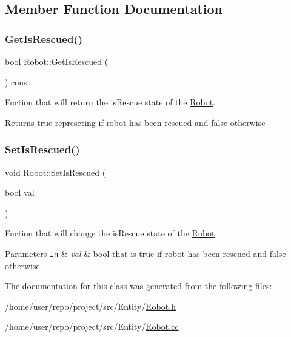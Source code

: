 \subsection{Member Function Documentation}
\mbox{\label{classRobot_a9c6db3ebb107d5e25fdb0c21b8cfa2e2}} 
\subsubsection{\texorpdfstring{Get\+Is\+Rescued()}{GetIsRescued()}}
{\footnotesize\ttfamily bool Robot\+::\+Get\+Is\+Rescued (\begin{DoxyParamCaption}{ }\end{DoxyParamCaption}) const}



Fuction that will return the is\+Rescue state of the \hyperlink{classRobot}{Robot}. 

\begin{DoxyReturn}{Returns}
true represeting if robot has been rescued and false otherwise 
\end{DoxyReturn}
\mbox{\label{classRobot_aef63efbf557ef2a7bda196980d24375f}} 
\subsubsection{\texorpdfstring{Set\+Is\+Rescued()}{SetIsRescued()}}
{\footnotesize\ttfamily void Robot\+::\+Set\+Is\+Rescued (\begin{DoxyParamCaption}\item[{bool}]{val }\end{DoxyParamCaption})}



Fuction that will change the is\+Rescue state of the \hyperlink{classRobot}{Robot}. 


\begin{DoxyParams}[1]{Parameters}
\mbox{\tt in}  & {\em val} & bool that is true if robot has been rescued and false otherwise \\
\hline
\end{DoxyParams}


The documentation for this class was generated from the following files\+:\begin{DoxyCompactItemize}
\item 
/home/user/repo/project/src/\+Entity/\hyperlink{Robot_8h}{Robot.\+h}\item 
/home/user/repo/project/src/\+Entity/\hyperlink{Robot_8cc}{Robot.\+cc}\end{DoxyCompactItemize}
